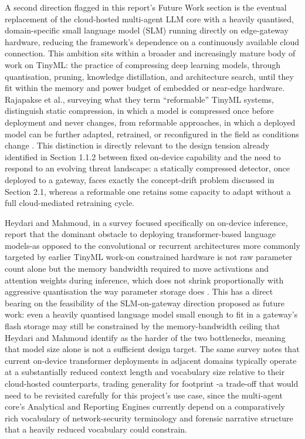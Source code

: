 A second direction flagged in this report's Future Work section is the eventual replacement of the cloud-hosted multi-agent LLM core with a heavily quantised, domain-specific small language model (SLM) running directly on edge-gateway hardware, reducing the framework's dependence on a continuously available cloud connection. This ambition sits within a broader and increasingly mature body of work on TinyML: the practice of compressing deep learning models, through quantisation, pruning, knowledge distillation, and architecture search, until they fit within the memory and power budget of embedded or near-edge hardware. Rajapakse et al., surveying what they term ``reformable'' TinyML systems, distinguish static compression, in which a model is compressed once before deployment and never changes, from reformable approaches, in which a deployed model can be further adapted, retrained, or reconfigured in the field as conditions change \cite{Rajapakse2023}. This distinction is directly relevant to the design tension already identified in Section 1.1.2 between fixed on-device capability and the need to respond to an evolving threat landscape: a statically compressed detector, once deployed to a gateway, faces exactly the concept-drift problem discussed in Section 2.1, whereas a reformable one retains some capacity to adapt without a full cloud-mediated retraining cycle.

Heydari and Mahmoud, in a survey focused specifically on on-device inference, report that the dominant obstacle to deploying transformer-based language models-as opposed to the convolutional or recurrent architectures more commonly targeted by earlier TinyML work-on constrained hardware is not raw parameter count alone but the memory bandwidth required to move activations and attention weights during inference, which does not shrink proportionally with aggressive quantisation the way parameter storage does \cite{Heydari2025}. This has a direct bearing on the feasibility of the SLM-on-gateway direction proposed as future work: even a heavily quantised language model small enough to fit in a gateway's flash storage may still be constrained by the memory-bandwidth ceiling that Heydari and Mahmoud identify as the harder of the two bottlenecks, meaning that model size alone is not a sufficient design target. The same survey notes that current on-device transformer deployments in adjacent domains typically operate at a substantially reduced context length and vocabulary size relative to their cloud-hosted counterparts, trading generality for footprint \cite{Heydari2025}-a trade-off that would need to be revisited carefully for this project's use case, since the multi-agent core's Analytical and Reporting Engines currently depend on a comparatively rich vocabulary of network-security terminology and forensic narrative structure that a heavily reduced vocabulary could constrain.


